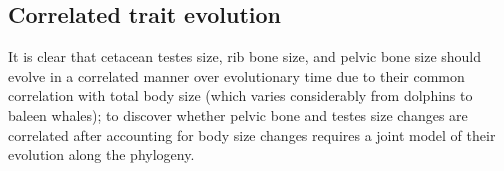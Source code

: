 \documentclass[12pt]{article}
\newcommand{\href}[2]{#2 (\texttt{#1})}
\begin{document}
% 
% 
% 



\subsection*{Correlated trait evolution}

It is clear that cetacean testes size, rib bone size, and pelvic bone size
should evolve in a correlated manner over evolutionary time
due to their common correlation with total body size 
(which varies considerably from dolphins to baleen whales);
to discover whether pelvic bone and testes size changes are correlated
after accounting for body size changes
requires a joint model of their evolution along the phylogeny.
\end{document}
